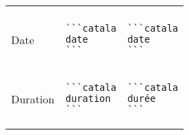 \documentclass[a3paper,landscape]{article}
\begin{document}
\begin{multicols*}{2}
\begin{center}
\begin{tabular}{p{}p{}p{}}
\vspace*{-1.7em}
\\
Date&
\vspace*{-1.7em}
\begin{verbatim}
```catala
date
```
\end{verbatim}
\vspace*{-1.7em}
&
\vspace*{-1.7em}
\begin{verbatim}
```catala
date
```
\end{verbatim}
\vspace*{-1.7em}
\\
Duration&
\vspace*{-1.7em}
\begin{verbatim}
```catala
duration
```
\end{verbatim}
\vspace*{-1.7em}
&
\vspace*{-1.7em}
\begin{verbatim}
```catala
durée
```
\end{verbatim}
\vspace*{-1.7em}
\\
\bottomrule
\end{tabular}
\end{center}











\end{multicols*}
\end{document}
